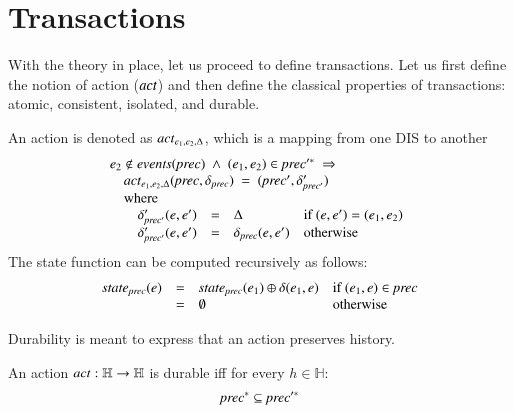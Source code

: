 \documentclass{elsarticle}
\def\id#1{\text{\it #1\/}}
\begin{document}
\section{Transactions}
\label{sct:Transactions}
	With the theory in place, let us proceed to define transactions.
	Let us first define the notion of action ($\id{act}$)
	and then define the classical properties of transactions: atomic, consistent, isolated, and durable.

	An action is denoted as $\id{act}_{e_1,e_2,\Delta}$, which is a mapping from one DIS to another
\begin{equation}
\begin{array}{rl}
	\multicolumn{2}{l}{e_2\not\in\id{events}(\id{prec})\ \wedge\ (e_1,e_2)\in\id{prec}'^*\ \Rightarrow}\\
	&\id{act}_{e_1,e_2,\Delta}(\id{prec},\delta_\id{prec})\ =\ (\id{prec}',\delta'_{\id{prec}'})\\
	&\text{where}\\
	&\ \ \begin{array}[t]{rcll}
		\delta'_{\id{prec}'}(e,e')&=&\Delta&\text{if }(e,e')=(e_1,e_2)\\
		\delta'_{\id{prec}'}(e,e')&=&\delta_\id{prec}(e,e')&\text{otherwise}\\
		\end{array}
\end{array}
\end{equation}
	The state function can be computed recursively as follows:
\begin{equation}
\begin{array}{rcll}
	\id{state}_\id{prec}(e)&=&\id{state}_\id{prec}(e_1)\oplus\delta(e_1,e)&\text{if }(e_1,e)\in\id{prec}\\
	                       &=&\emptyset&\text{otherwise}
\end{array}
\end{equation}


	Durability is meant to express that an action preserves history.
\begin{definition}[Durability]
\item An action $\id{act}:\mathbb H\rightarrow\mathbb H$ is durable iff for every $h\in\mathbb H$:
\label{def:Durability}
\begin{eqnarray}
	\id{prec}^*\subseteq\id{prec}'^*
\end{eqnarray}
\end{definition}
\end{document}
